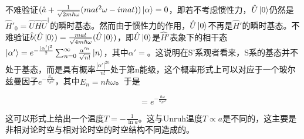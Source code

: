 \documentclass[a4paper]{article}
\begin{document}
            不难验证$(\hat{a}+\frac{1}{\sqrt{2m\hbar\omega}}(mat^2\omega-imat))\ket{\alpha}=0$，即若不考虑惯性力，$\hat{U}\ket{0}$仍然是$\hat{H}'_0=\hat{U}\hat{H}\hat{U}^\dagger$的瞬时基态。然而由于惯性力的作用，$\hat{U}\ket{0}$不再是$\hat{H}'$的瞬时基态。不难验证$\hat{b}(\hat{U}\ket{0})=\frac{mat}{\sqrt{4m\hbar\omega}}(\hat{U}\ket{0})$，即$\hat{U}\ket{0}$是$\hat{H}'$表象下的相干态$\ket{\alpha'}=e^{-\frac{|\alpha'|^2}{2}}\sum_{n=0}^\infty\frac{\alpha'^n}{\sqrt{n!}}\ket{n}$，其中$\alpha'=$。这说明在S'系观者看来，S系的基态并不处于基态，而是具有概率$\frac{|\alpha'|^{2n}}{n!}$处于第n能级，这个概率形式上可以对应于一个玻尔兹曼因子$e^{-\frac{E_n}{k_BT}}$，其中$E_n=n\hbar\omega$。于是

            \begin{equation}
                =e^{-\frac{\hbar\omega}{k_BT}}
            \end{equation}

            这可以形式上给出一个温度$T=-\frac{1}{\ln a}$。这与Unruh温度$T\propto a$是不同的，这主要是非相对论时空与相对论时空的时空结构不同造成的。
\end{document}
